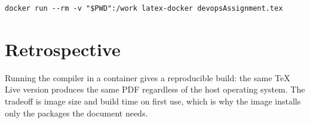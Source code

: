 \begin{listing}[H]
\begin{verbatim}
docker run --rm -v "$PWD":/work latex-docker devopsAssignment.tex
\end{verbatim}
\caption{Compiling a minted-based document.}
\end{listing}

\section{Retrospective}
Running the compiler in a container gives a reproducible build: the same TeX
Live version produces the same PDF regardless of the host operating system.
The tradeoff is image size and build time on first use, which is why the image
installs only the packages the document needs.
